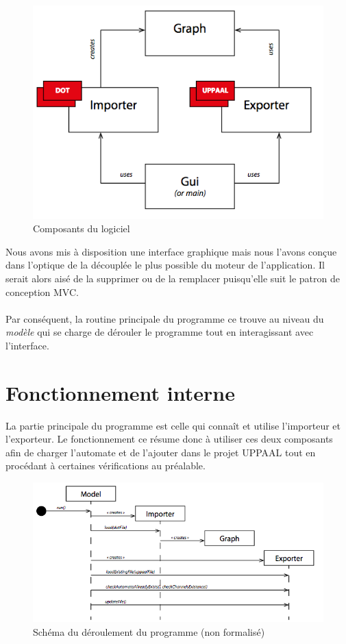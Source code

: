 \documentclass[12pt,a4paper]{report}
\begin{document}
\begin{figure}[!h]
  \centering
  \includegraphics[scale=0.6]{ressources/archi.png}
  \caption{Composants du logiciel}
\end{figure}

Nous avons mis à disposition une interface graphique mais nous l'avons conçue dans l'optique 
de la découplée le plus possible du moteur de l'application. Il serait alors aisé de la supprimer
ou de la remplacer puisqu'elle suit le patron de conception MVC. 
\\\\
Par conséquent, la routine principale du programme ce trouve au niveau du 
\emph{modèle} qui se charge de dérouler le programme tout en interagissant 
avec l'interface.

\section{Fonctionnement interne}

La partie principale du programme est celle qui connaît et utilise l'importeur 
et l'exporteur. Le fonctionnement ce résume donc à utiliser ces deux composants
afin de charger l'automate et de l'ajouter dans le projet UPPAAL tout en procédant
à certaines vérifications au préalable.

\begin{figure}[!h]
  \centering
  \includegraphics[scale=0.6]{ressources/deroulement.png}
  \caption{Schéma du déroulement du programme (non formalisé)}
\end{figure}
\end{document}
